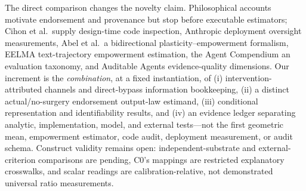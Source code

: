 The direct comparison changes the novelty claim. Philosophical accounts
motivate endorsement and provenance but stop before executable estimators;
Cihon et al.\ supply design-time code inspection, Anthropic deployment
oversight measurements, Abel et al.\ a bidirectional plasticity--empowerment
formalism, EELMA text-trajectory empowerment estimation, the Agent Compendium
an evaluation taxonomy, and Auditable Agents evidence-quality dimensions. Our
increment is the \emph{combination}, at a fixed instantiation, of (i)
intervention-attributed channels and direct-bypass information bookkeeping,
(ii) a distinct actual/no-surgery endorsement output-law estimand, (iii)
conditional representation and identifiability results, and (iv) an evidence
ledger separating analytic, implementation, model, and external tests---not
the first geometric mean, empowerment estimator, code audit, deployment
measurement, or audit schema. Construct validity remains open:
independent-substrate and external-criterion comparisons are pending, C0's
mappings are restricted explanatory crosswalks, and scalar readings are
calibration-relative, not demonstrated universal ratio measurements.

